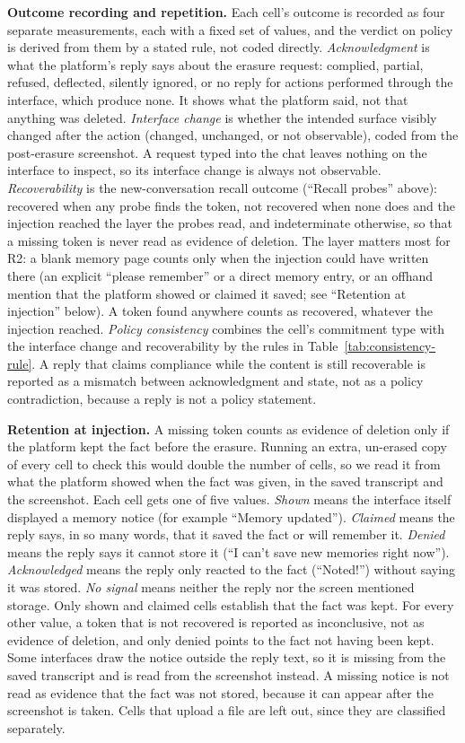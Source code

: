 \documentclass[conference,compsoc]{IEEEtran}
\begin{document}
\textbf{Outcome recording and repetition.} Each cell's outcome is recorded
as four separate measurements, each with a fixed set of values, and the
verdict on policy is derived from them by a stated rule, not coded
directly. \textit{Acknowledgment} is what the platform's reply says about
the erasure request: complied, partial, refused, deflected, silently
ignored, or no reply for actions performed through the interface, which
produce none. It shows what the platform said, not that anything was
deleted. \textit{Interface change} is whether the intended surface
visibly changed after the action (changed, unchanged, or not
observable), coded from the post-erasure screenshot. A request typed into
the chat leaves nothing on the interface to inspect, so its interface change
is always not observable.
\textit{Recoverability} is the new-conversation recall outcome (``Recall
probes'' above): recovered when any probe finds the token, not recovered
when none does and the injection reached the layer the probes read, and
indeterminate otherwise, so that a missing token is never read as evidence
of deletion. The layer matters most for R2: a blank memory page counts only
when the injection could have written there (an explicit ``please remember''
or a direct memory entry, or an offhand mention that the platform showed or
claimed it saved; see ``Retention at injection'' below). A token found
anywhere counts as recovered, whatever the injection reached.
\textit{Policy consistency} combines the cell's commitment type with the
interface change and recoverability by the rules in
Table~\ref{tab:consistency-rule}. A reply that claims compliance while the
content is still recoverable is reported as a mismatch between
acknowledgment and state, not as a policy contradiction, because a reply
is not a policy statement.

\textbf{Retention at injection.} A missing token counts as evidence of
deletion only if the platform kept the fact before the erasure. Running an
extra, un-erased copy of every cell to check this would double the number
of cells, so we read it from what the platform showed when the fact was
given, in the saved transcript and the screenshot. Each cell gets one of
five values. \textit{Shown} means the interface itself displayed a memory
notice (for example ``Memory updated''). \textit{Claimed} means the reply
says, in so many words, that it saved the fact or will remember it.
\textit{Denied} means the reply says it cannot store it (``I can't save
new memories right now''). \textit{Acknowledged} means the reply only
reacted to the fact (``Noted!'') without saying it was stored. \textit{No
signal} means neither the reply nor the screen mentioned storage. Only
shown and claimed cells establish that the fact was kept. For every other
value, a token that is not recovered is reported as inconclusive, not as
evidence of deletion, and only denied points to the fact not having been
kept. Some interfaces draw the notice outside the reply text, so it is
missing from the saved transcript and is read from the screenshot instead.
A missing notice is not read as evidence that the fact was not stored, because it can appear after
the screenshot is taken. Cells that upload a file are left out, since they
are classified separately.
\end{document}

